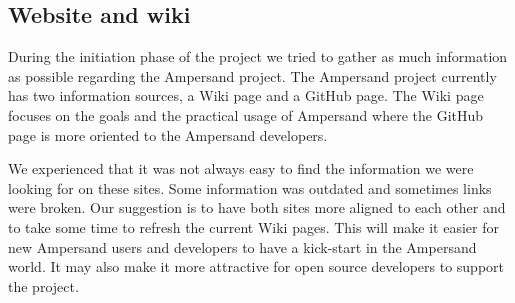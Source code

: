 
\subsection{Website and wiki}
\label{recommendations:website}
During the initiation phase of the project we tried to gather as much information as possible regarding the Ampersand project.
The Ampersand project currently has two information sources, a Wiki page and a GitHub page.
The Wiki page focuses on the goals and the practical usage of Ampersand where the GitHub page is more oriented to the Ampersand developers.

We experienced that it was not always easy to find the information we were looking for on these sites.
Some information was outdated and sometimes links were broken. 
Our suggestion is to have both sites more aligned to each other and to take some time to refresh the current Wiki pages.
This will make it easier for new Ampersand users and developers to have a kick-start in the Ampersand world.
It may also make it more attractive for open source developers to support the project.

